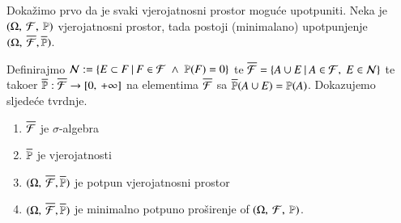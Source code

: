\begin{rj}  \label{rj:3.10}
    Doka\v zimo prvo da je svaki vjerojatnosni prostor mogu\' ce upotpuniti. Neka je $(\Omega, \: \mathcal{F}, \: \mathbb{P})$ vjerojatnosni prostor, tada postoji (minimalano) upotpunjenje $(\Omega, \: \overline{\mathcal{F}}, \overline{\mathbb{P}})$.

    Definirajmo $\mathcal{N} := \{{E \subset F} \: | \: {F \in \mathcal{F} \; \land \; \mathbb{P}({F}) = 0}\}$ te $\overline{\mathcal{F}} = \{{A \cup E} \: | \: {A \in \mathcal{F}, \; E \in \mathcal{N}}\}$ te tako\dj er $\overline{\mathbb{P}} : \overline{\mathcal{F}} \to [{0}, \:{+\infty}]$ na elementima $\overline{\mathcal{F}}$ sa $\overline{\mathbb{P}}(A \cup E) = \mathbb{P}({A})$.
    Dokazujemo sljede\' ce tvrdnje.
    \begin{enumerate}[label=(\arabic*)]
        \item   \label{rj:3.10.1}
        $\overline{\mathcal{F}}$ je $\sigma$-algebra
        \item   \label{rj:3.10.2}
        $\overline{\mathbb{P}}$ je vjerojatnosti
        \item   \label{rj:3.10.3}
        $(\Omega, \: \overline{\mathcal{F}}, \overline{\mathbb{P}})$ je potpun vjerojatnosni prostor
        \item   \label{rj:3.10.4}
        $(\Omega, \: \overline{\mathcal{F}}, \overline{\mathbb{P}})$ je minimalno potpuno pro\v sirenje of $(\Omega, \: \mathcal{F}, \: \mathbb{P})$.
    \end{enumerate}


\end{rj}
